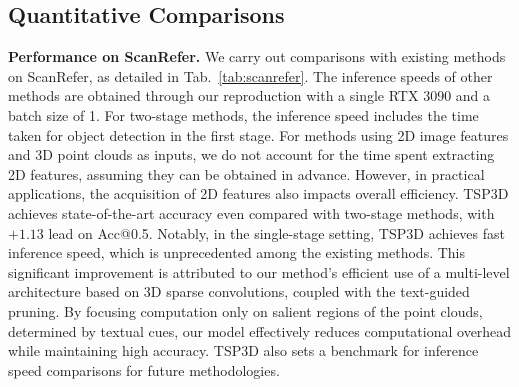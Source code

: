 \begin{table*}[t]
\begin{minipage}{0.334\textwidth}
  \caption{Influence of different feature upsampling methods. Evaluated on ScanRefer.}
  \vspace{-.2cm}
  \label{tab:ablation3}
\end{minipage}
\vspace{-.3cm}
\end{table*}

\subsection{Quantitative Comparisons}
\textbf{Performance on ScanRefer.}
We carry out comparisons with existing methods on ScanRefer, as detailed in Tab.~\ref{tab:scanrefer}. The inference speeds of other methods are obtained through our reproduction with a single RTX 3090 and a batch size of 1. For two-stage methods, the inference speed includes the time taken for object detection in the first stage. For methods using 2D image features and 3D point clouds as inputs, we do not account for the time spent extracting 2D features, assuming they can be obtained in advance. However, in practical applications, the acquisition of 2D features also impacts overall efficiency.
TSP3D achieves state-of-the-art accuracy even compared with two-stage methods, with $+1.13$ lead on Acc@0.5. Notably, in the single-stage setting, TSP3D achieves fast inference speed, which is unprecedented among the existing methods.
This significant improvement is attributed to our method's efficient use of a multi-level architecture based on 3D sparse convolutions, coupled with the text-guided pruning. By focusing computation only on salient regions of the point clouds, determined by textual cues, our model effectively reduces computational overhead while maintaining high accuracy. 
TSP3D also sets a benchmark for inference speed comparisons for future methodologies.


